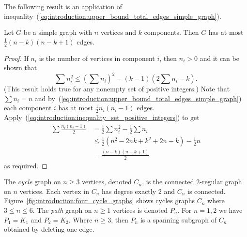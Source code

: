 The following result is an application of
inequality~(\ref{eq:introduction:upper_bound_total_edges_simple_graph}).

\begin{theorem}
Let $G$ be a simple graph with $n$ vertices and $k$ components. Then
$G$ has at most $\frac{1}{2} (n - k)(n - k + 1)$ edges.
\end{theorem}

\begin{proof}
If $n_i$ is the number of vertices in component $i$, then $n_i > 0$
and it can be shown that
%
\begin{equation}
\label{eq:introduction:inequality_set_positive_integers}
\sum n_i^2
\leq
\left(\sum n_i\right)^2 - (k - 1) \left(2 \sum n_i - k\right).
\end{equation}
%
(This result holds true for any nonempty set of positive integers.)
Note that $\sum n_i = n$ and
by~(\ref{eq:introduction:upper_bound_total_edges_simple_graph}) each
component $i$ has at most $\frac{1}{2} n_i (n_i - 1)$
edges. Apply~(\ref{eq:introduction:inequality_set_positive_integers})
to get
%
\begin{align*}
\sum \frac{n_i (n_i - 1)}{2}
&=
\frac{1}{2} \sum n_i^2 - \frac{1}{2} \sum n_i \\
&\leq
\frac{1}{2} (n^2 - 2nk + k^2 + 2n - k) - \frac{1}{2} n \\
&=
\frac{(n - k) (n - k + 1)}{2}
\end{align*}
%
as required.
\end{proof}

The \emph{cycle} graph on $n \geq 3$ vertices, denoted $C_n$, is the
connected $2$-regular graph on $n$ vertices. Each vertex in $C_n$ has
degree exactly $2$ and $C_n$ is
connected. Figure~\ref{fig:introduction:four_cycle_graphs} shows
cycles graphs $C_n$ where $3 \leq n \leq 6$. The \emph{path} graph on
$n \geq 1$ vertices is denoted $P_n$. For $n = 1, 2$ we have
$P_1 = K_1$ and $P_2 = K_2$. Where $n \geq 3$, then $P_n$ is a
spanning subgraph of $C_n$ obtained by deleting one edge.

